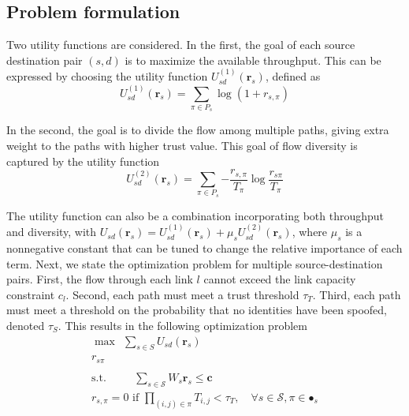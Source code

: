 \documentclass[conference]{IEEEtran}
\begin{document}
\subsection{Problem formulation}
\label{subsec:centralized}
Two utility functions are considered.  In the first, the goal of each source destination pair $(s,d)$ is to maximize the available throughput. This can be expressed by choosing the utility function $U_{sd}^{(1)}(\mathbf{r}_{s})$, defined as
\begin{equation}
\label{eq:utility}
U_{sd}^{(1)}(\mathbf{r}_{s}) = \sum_{\pi \in P_{s}}{\log{(1 + r_{s,\pi})}} \end{equation}


In the second, the goal is to divide the flow among multiple paths, giving extra weight to the paths with higher trust value.  This goal of flow diversity is captured by the utility function
\begin{equation}
\label{eq:utility1}
U_{sd}^{(2)}(\mathbf{r}_{s}) = \sum_{\pi \in P_{s}}{-\frac{r_{s,\pi}}{T_{\pi}}\log{\frac{r_{s\pi}}{T_{\pi}}}}
\end{equation}

The utility function can also be a combination incorporating both throughput and diversity, with $U_{sd}(\mathbf{r}_{s}) = U_{sd}^{(1)}(\mathbf{r}_{s}) + \mu_{s}U_{sd}^{(2)}(\mathbf{r}_{s})$, where $\mu_{s}$ is a nonnegative constant that can be tuned to change the relative importance of each term.  Next, we state the optimization problem for multiple source-destination pairs. First, the flow through each link $l$ cannot exceed the link capacity constraint $c_{l}$.  Second, each path must meet a trust threshold $\tau_{T}$.  Third, each path must meet a  threshold on the probability that no identities have been spoofed, denoted $\tau_{S}$.  This results in the following optimization problem
\begin{equation}
\label{eq:flow_opt}
\begin{array}{l}
\max \>\>  \sum_{s \in S}{U_{sd}(\mathbf{r}_{s})}\\
r_{s\pi} \\
\\
\mbox{s.t.} \>\> \hspace{25pt} \sum_{s \in \mathcal{S}}{W_{s}\mathbf{r}_{s}} \leq \mathbf{c} \\
r_{s,\pi} = 0 \mbox{ if $\prod_{(i,j) \in \pi}{T_{i,j}} < \tau_{T}$}, \quad \forall s \in \mathcal{S}, \pi \in \mathcal{•}_{s}\\


 \end{array}
 \end{equation}
\end{document}
